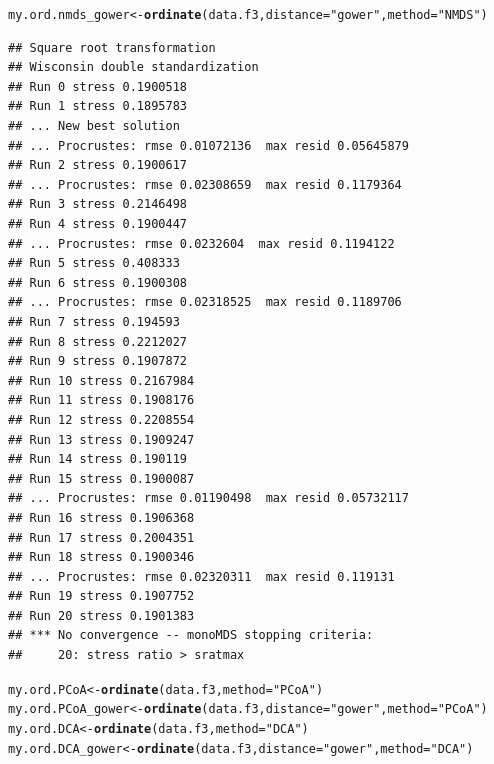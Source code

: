 \documentclass[12pt]{article}\usepackage[]{graphicx}\usepackage[]{color}
\makeatletter
\newcommand{\hlstr}[1]{\textcolor[rgb]{0.192,0.494,0.8}{#1}}%
\newcommand{\hlstd}[1]{\textcolor[rgb]{0.345,0.345,0.345}{#1}}%
\newcommand{\hlkwb}[1]{\textcolor[rgb]{0.69,0.353,0.396}{#1}}%
\newcommand{\hlkwc}[1]{\textcolor[rgb]{0.333,0.667,0.333}{#1}}%
\newcommand{\hlkwd}[1]{\textcolor[rgb]{0.737,0.353,0.396}{\textbf{#1}}}%
\newenvironment{kframe}{%
 \def\at@end@of@kframe{}%
 \ifinner\ifhmode%
  \def\at@end@of@kframe{\end{minipage}}%
  \begin{minipage}{\columnwidth}%
 \fi\fi%
 \def\FrameCommand##1{\hskip\@totalleftmargin \hskip-\fboxsep
 \colorbox{shadecolor}{##1}\hskip-\fboxsep
     \hskip-\linewidth \hskip-\@totalleftmargin \hskip\columnwidth}%
 \MakeFramed {\advance\hsize-\width
   \@totalleftmargin\z@ \linewidth\hsize
   \@setminipage}}%
 {\par\unskip\endMakeFramed%
 \at@end@of@kframe}
\newenvironment{knitrout}{}{} %
\numberwithin{figure}{section}
\makeatother
\begin{document}
\begin{knitrout}\small
{}\color{fgcolor}\begin{kframe}
\begin{alltt}
\hlstd{my.ord.nmds_gower} \hlkwb{<-} \hlkwd{ordinate}\hlstd{(data.f3,} \hlkwc{distance} \hlstd{=} \hlstr{"gower"}\hlstd{,}  \hlkwc{method} \hlstd{=} \hlstr{"NMDS"}\hlstd{)}
\end{alltt}
\begin{verbatim}
## Square root transformation
## Wisconsin double standardization
## Run 0 stress 0.1900518 
## Run 1 stress 0.1895783 
## ... New best solution
## ... Procrustes: rmse 0.01072136  max resid 0.05645879 
## Run 2 stress 0.1900617 
## ... Procrustes: rmse 0.02308659  max resid 0.1179364 
## Run 3 stress 0.2146498 
## Run 4 stress 0.1900447 
## ... Procrustes: rmse 0.0232604  max resid 0.1194122 
## Run 5 stress 0.408333 
## Run 6 stress 0.1900308 
## ... Procrustes: rmse 0.02318525  max resid 0.1189706 
## Run 7 stress 0.194593 
## Run 8 stress 0.2212027 
## Run 9 stress 0.1907872 
## Run 10 stress 0.2167984 
## Run 11 stress 0.1908176 
## Run 12 stress 0.2208554 
## Run 13 stress 0.1909247 
## Run 14 stress 0.190119 
## Run 15 stress 0.1900087 
## ... Procrustes: rmse 0.01190498  max resid 0.05732117 
## Run 16 stress 0.1906368 
## Run 17 stress 0.2004351 
## Run 18 stress 0.1900346 
## ... Procrustes: rmse 0.02320311  max resid 0.119131 
## Run 19 stress 0.1907752 
## Run 20 stress 0.1901383 
## *** No convergence -- monoMDS stopping criteria:
##     20: stress ratio > sratmax
\end{verbatim}
\begin{alltt}
\hlstd{my.ord.PCoA} \hlkwb{<-} \hlkwd{ordinate}\hlstd{(data.f3,} \hlkwc{method} \hlstd{=} \hlstr{"PCoA"}\hlstd{)}
\hlstd{my.ord.PCoA_gower} \hlkwb{<-} \hlkwd{ordinate}\hlstd{(data.f3,} \hlkwc{distance} \hlstd{=} \hlstr{"gower"}\hlstd{,} \hlkwc{method} \hlstd{=} \hlstr{"PCoA"}\hlstd{)}
\hlstd{my.ord.DCA} \hlkwb{<-} \hlkwd{ordinate}\hlstd{(data.f3,} \hlkwc{method} \hlstd{=} \hlstr{"DCA"}\hlstd{)}
\hlstd{my.ord.DCA_gower} \hlkwb{<-} \hlkwd{ordinate}\hlstd{(data.f3,} \hlkwc{distance} \hlstd{=} \hlstr{"gower"}\hlstd{,} \hlkwc{method} \hlstd{=} \hlstr{"DCA"}\hlstd{)}


\end{alltt}
\end{kframe}
\end{knitrout}
\end{document}
